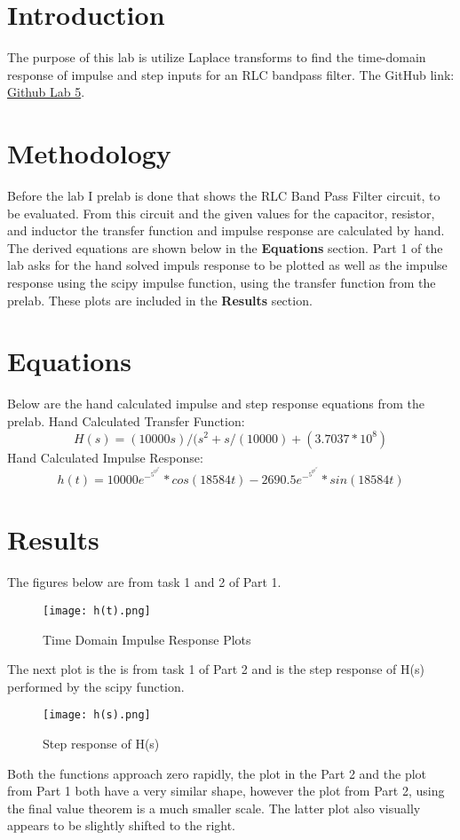 \documentclass[12pt]{report}
\begin{document}
\section{Introduction}
 The purpose of this lab is utilize Laplace transforms to find the time-domain response of impulse and step inputs for an RLC bandpass filter.  \newline \newline The GitHub link: \href{https://github.com/CDJohnson279}{Github Lab 5}. 

\section{Methodology}
Before the lab I prelab is done that shows the RLC Band Pass Filter circuit, to be evaluated. From this circuit and the given values for the capacitor, resistor, and inductor the transfer function and impulse response are calculated by hand. The derived equations are shown below in the \textbf{Equations} section. Part 1 of the lab asks for the hand solved impuls response to be plotted as well as the impulse response using the scipy impulse function, using the transfer function from the prelab. These plots are included in the \textbf{Results} section. 


\section{Equations}
Below are the hand calculated impulse and step response equations from the prelab. 
\newline
Hand Calculated Transfer Function: $$H(s) = (10000s)/(s^2 + s/(10000) + (3.7037*10^8)$$\newline
Hand Calculated Impulse Response: $$h(t) = 10000e^-^5^0^0^0^t*cos(18584t)-2690.5e^-^5^0^0^0^t*sin(18584t)$$
\newpage 
\section{Results}
The figures below are from task 1 and 2 of Part 1.
\begin{figure}[htp]
    \centering
    \texttt{[image: h(t).png]}
    \caption{Time Domain Impulse Response Plots}
    \label{fig:Part 1.png}
\end{figure}
\newline\newpage
The next plot is the is from task 1 of Part 2 and is the step response of H(s) performed by the scipy function. 
\begin{figure}[htp]
    \centering
    \texttt{[image: h(s).png]}
    \caption{Step response of H(s)}
    \label{fig:Part 1.png}
\end{figure}
\newline
Both the functions approach zero rapidly, the plot in the Part 2 and the plot from Part 1 both have a very similar shape, however the plot from Part 2, using the final value theorem is a much smaller scale. The latter plot also visually appears to be slightly shifted to the right. 
\end{document}
